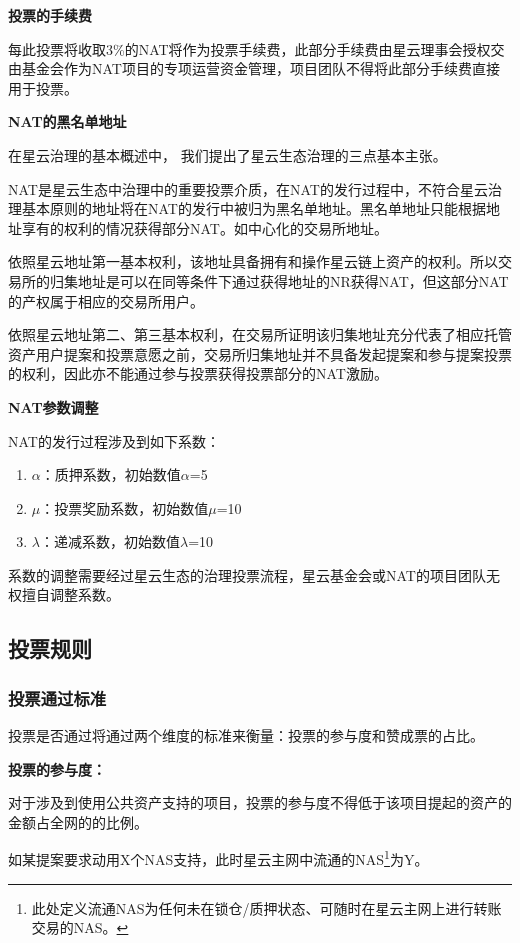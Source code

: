 \textbf{投票的手续费}

每此投票将收取3\%的NAT将作为投票手续费，此部分手续费由星云理事会授权交由基金会作为NAT项目的专项运营资金管理，项目团队不得将此部分手续费直接用于投票。

\textbf{NAT的黑名单地址}

在星云治理的基本概述中， 我们提出了星云生态治理的三点基本主张。

NAT是星云生态中治理中的重要投票介质，在NAT的发行过程中，不符合星云治理基本原则的地址将在NAT的发行中被归为黑名单地址。黑名单地址只能根据地址享有的权利的情况获得部分NAT。如中心化的交易所地址。

依照星云地址第一基本权利，该地址具备拥有和操作星云链上资产的权利。所以交易所的归集地址是可以在同等条件下通过获得地址的NR获得NAT，但这部分NAT的产权属于相应的交易所用户。

依照星云地址第二、第三基本权利，在交易所证明该归集地址充分代表了相应托管资产用户提案和投票意愿之前，交易所归集地址并不具备发起提案和参与提案投票的权利，因此亦不能通过参与投票获得投票部分的NAT激励。

\textbf{NAT参数调整}

NAT的发行过程涉及到如下系数：

\begin{enumerate}
	\item $\alpha$：质押系数，初始数值$\alpha$=5
	\item $\mu$：投票奖励系数，初始数值$\mu$=10
	\item $\lambda$：递减系数，初始数值$\lambda$=10
\end{enumerate}

系数的调整需要经过星云生态的治理投票流程，星云基金会或NAT的项目团队无权擅自调整系数。

\subsection{投票规则}
	
\subsubsection{投票通过标准}
	
投票是否通过将通过两个维度的标准来衡量：投票的参与度和赞成票的占比。

\textbf{投票的参与度：}

对于涉及到使用公共资产支持的项目，投票的参与度不得低于该项目提起的资产的金额占全网的的比例。

如某提案要求动用X个NAS支持，此时星云主网中流通的NAS\footnote{此处定义流通NAS为任何未在锁仓/质押状态、可随时在星云主网上进行转账交易的NAS。}为Y。

